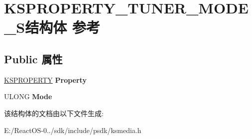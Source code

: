 \hypertarget{struct_k_s_p_r_o_p_e_r_t_y___t_u_n_e_r___m_o_d_e___s}{}\section{K\+S\+P\+R\+O\+P\+E\+R\+T\+Y\+\_\+\+T\+U\+N\+E\+R\+\_\+\+M\+O\+D\+E\+\_\+\+S结构体 参考}
\label{struct_k_s_p_r_o_p_e_r_t_y___t_u_n_e_r___m_o_d_e___s}
\subsection*{Public 属性}
\begin{DoxyCompactItemize}
\item 
\mbox{\label{struct_k_s_p_r_o_p_e_r_t_y___t_u_n_e_r___m_o_d_e___s_ae338de814a25b7eff5427d9ec2c49a6d}} 
\hyperlink{struct_k_s_i_d_e_n_t_i_f_i_e_r}{K\+S\+P\+R\+O\+P\+E\+R\+TY} {\bfseries Property}
\item 
\mbox{\label{struct_k_s_p_r_o_p_e_r_t_y___t_u_n_e_r___m_o_d_e___s_a76b56ba348cfc6b9629c1518cfc70cd9}} 
U\+L\+O\+NG {\bfseries Mode}
\end{DoxyCompactItemize}


该结构体的文档由以下文件生成\+:\begin{DoxyCompactItemize}
\item 
E\+:/\+React\+O\+S-\/0../sdk/include/psdk/ksmedia.\+h\end{DoxyCompactItemize}
